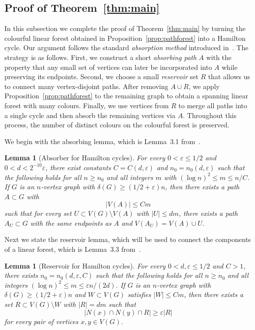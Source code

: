 \documentclass[11pt,reqno]{amsart}
\newtheorem{lemma}[theorem]{Lemma}
\theoremstyle{definition}
\theoremstyle{remark}
\renewcommand\leq{\leqslant}
\renewcommand\le{\leqslant}
\renewcommand\ge{\geqslant}
\begin{document}
\subsection{Proof of Theorem~\ref{thm:main}}

In this subsection we complete the proof of Theorem~\ref{thm:main} by turning the
colourful linear forest obtained in Proposition~\ref{prop:pathforest} into a
Hamilton cycle.
Our argument follows the standard \emph{absorption method} introduced
in~\cite{RRS}. The strategy is as follows.
First, we construct a short \emph{absorbing path} $A$ with the property that any
small set of vertices can later be incorporated into $A$ while preserving its
endpoints.
Second, we choose a small \emph{reservoir} set $R$ that allows us to connect many
vertex-disjoint paths.
After removing $A\cup R$, we apply Proposition~\ref{prop:pathforest} to the
remaining graph to obtain a spanning linear forest with many colours.
Finally, we use vertices from $R$ to merge all paths into a single cycle and then
absorb the remaining vertices via $A$.
Throughout this process, the number of distinct colours on the colourful forest is preserved.

We begin with the absorbing lemma, which is Lemma~3.1 from~\cite{PY}.

\begin{lemma}[Absorber for Hamilton cycles]\label{lem:absorber}
For every $0<\varepsilon\leq 1/2$ and $0<d<2^{-10}\varepsilon$, there exist constants
$C=C(d,\varepsilon)$ and $n_0=n_0(d,\varepsilon)$ such that the following holds
for all $n\ge n_0$ and all integers $m$ with $(\log n)^2\le m\le n/C$.
If $G$ is an $n$-vertex graph with $\delta(G)\ge (1/2+\varepsilon)n$, then there
exists a path $A\subset G$ with
\[
|V(A)|\le Cm
\]
such that for every set $U\subset V(G)\setminus V(A)$ with $|U|\le dm$, there
exists a path $A_U\subset G$ with the same endpoints as $A$ and
$V(A_U)=V(A)\cup U$.
\end{lemma}

Next we state the reservoir lemma, which will be used to connect the components
of a linear forest, which is Lemma~3.3 from~\cite{PY}.

\begin{lemma}[Reservoir for Hamilton cycles]\label{lem:reservoir}
For every $0<d,\varepsilon\leq 1/2$ and $C>1$, there exists $n_0=n_0(d,\varepsilon,C)$
such that the following holds for all $n\ge n_0$ and all integers
$(\log n)^2\le m\le \varepsilon n/(2d)$.
If $G$ is an $n$-vertex graph with $\delta(G)\ge (1/2+\varepsilon)n$ and
$W\subset V(G)$ satisfies $|W|\le Cm$, then there exists a set
$R\subset V(G)\setminus W$ with $|R|=dm$ such that
\[
|N(x)\cap N(y)\cap R|\ge \varepsilon|R|
\]
for every pair of vertices $x,y\in V(G)$.
\end{lemma}
\end{document}
